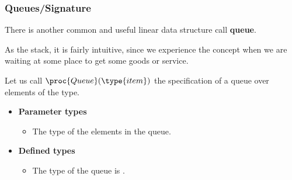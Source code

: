 
%
\begin{frame}
\frametitle{Queues/Signature}

There is another common and useful linear data structure call
\textbf{queue}. 

\bigskip

As the stack, it is fairly intuitive, since we experience the concept
when we are waiting at some place to get some goods or service.

\bigskip

Let us call \(\proc{Queue} (\type{item})\) the specification of a
queue over elements of the  type.
\begin{itemize}

  \item \textbf{Parameter types}

  \begin{itemize}

    \item The type  of the elements in the queue.

  \end{itemize}

  \item \textbf{Defined types}

   \begin{itemize}

     \item The type of the queue is .

   \end{itemize}

\end{itemize}

\end{frame}

